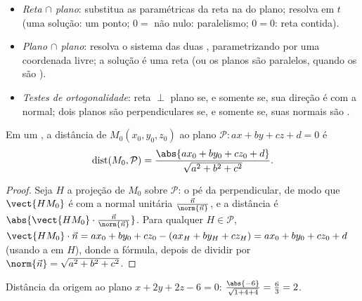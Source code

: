 \begin{method}\label{met:g12:space:intersections}
\begin{itemize}
  \item \emph{Reta $\cap$ plano}: substitua as  paramétricas da
        reta na  do plano; resolva em $t$ (uma solução: um ponto;
        $0 = $ não nulo: paralelismo; $0 = 0$: reta contida).
  \item \emph{Plano $\cap$ plano}: resolva o sistema das duas ,
        parametrizando por uma coordenada livre; a solução é uma reta (ou
        os planos são paralelos, quando os  são
        ).
  \item \emph{Testes de ortogonalidade}: reta $\perp$ plano se, e somente
        se, sua direção é  com a normal; dois planos são
        perpendiculares se, e somente se, suas normais são .
\end{itemize}
\end{method}

\begin{proposition}\label{prop:g12:space:distance}
Em um , a distância de $M_0(x_0, y_0, z_0)$ ao plano
$\mathcal P : ax + by + cz + d = 0$ é
\[
\operatorname{dist}(M_0, \mathcal P)
= \frac{\abs{ax_0 + by_0 + cz_0 + d}}{\sqrt{a^2 + b^2 + c^2}}.
\]
\end{proposition}

\begin{proof}
Seja $H$ a projeção  de $M_0$ sobre $\mathcal P$: o pé da
perpendicular, de modo que $\vect{HM_0}$ é  com a normal unitária
$\frac{\vec n}{\norm{\vec n}}$, e a distância é
$\abs{\vect{HM_0}\cdot \frac{\vec n}{\norm{\vec n}}}$. Para qualquer
$H \in \mathcal P$,
$\vect{HM_0}\cdot\vec n = ax_0 + by_0 + cz_0 - (ax_H + by_H + cz_H)
= ax_0 + by_0 + cz_0 + d$ (usando a  em $H$), donde a fórmula,
depois de dividir por $\norm{\vec n} = \sqrt{a^2+b^2+c^2}$.
\end{proof}

\begin{example}\label{ex:g12:space:distance}
Distância da origem ao plano $x + 2y + 2z - 6 = 0$:
$\frac{\abs{-6}}{\sqrt{1 + 4 + 4}} = \frac63 = 2$.
\end{example}

